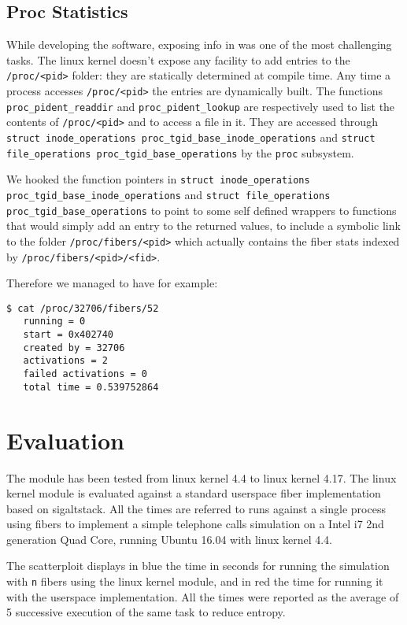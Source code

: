 \documentclass[11pt]{article}
\begin{document}
\subsection{Proc Statistics}
While developing the software, exposing info in  was one of the most challenging tasks. The linux kernel doesn't expose any facility to add entries to the {\tt /proc/<pid>} folder: they are statically determined at compile time. Any time a process accesses {\tt /proc/<pid>} the entries are dynamically built. The functions {\tt proc\_pident\_readdir} and {\tt proc\_pident\_lookup} are respectively used to list the contents of {\tt /proc/<pid>} and to access a file in it. They are accessed through {\tt struct inode\_operations proc\_tgid\_base\_inode\_operations} and {\tt struct file\_operations proc\_tgid\_base\_operations} by the {\tt proc} subsystem.

We hooked the function pointers in {\tt struct inode\_operations proc\_tgid\_base\_inode\_operations} and {\tt struct file\_operations proc\_tgid\_base\_operations} to point to some self defined wrappers to functions that would simply add an entry to the returned values, to include a symbolic link to the folder {\tt /proc/fibers/<pid>} which actually contains the fiber stats indexed by {\tt /proc/fibers/<pid>/<fid>}.

Therefore we managed to have for example:
\begin{verbatim}
$ cat /proc/32706/fibers/52
   running = 0
   start = 0x402740
   created by = 32706
   activations = 2
   failed activations = 0
   total time = 0.539752864
\end{verbatim}


\section{Evaluation}
The module has been tested from linux kernel 4.4 to linux kernel 4.17.
The linux kernel module is evaluated against a standard userspace fiber implementation based on sigaltstack. All the times are referred to runs against a single process using fibers to implement a simple telephone calls simulation on a Intel i7 2nd generation Quad Core, running Ubuntu 16.04 with linux kernel 4.4.

The scatterploit displays in {\color{blue} blue} the time in seconds for running the simulation with {\tt n} fibers using the linux kernel module, and in {\color{red} red} the time for running it with the userspace implementation. All the times were reported as the average of 5 successive execution of the same task to reduce entropy.
\end{document}

